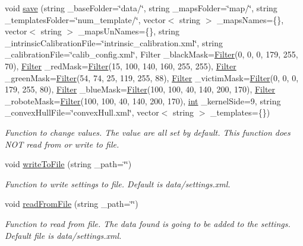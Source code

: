 \begin{DoxyCompactItemize}
void \mbox{\hyperlink{class_settings_a14ebf63b888dd7ecf7a34de9eaba1ae8}{save}} (string \+\_\+base\+Folder=\char`\"{}data/\char`\"{}, string \+\_\+maps\+Folder=\char`\"{}map/\char`\"{}, string \+\_\+templates\+Folder=\char`\"{}num\+\_\+template/\char`\"{}, vector$<$ string $>$ \+\_\+maps\+Names=\{\}, vector$<$ string $>$ \+\_\+maps\+Un\+Names=\{\}, string \+\_\+intrinsic\+Calibration\+File=\char`\"{}intrinsic\+\_\+calibration.\+xml\char`\"{}, string \+\_\+calibration\+File=\char`\"{}calib\+\_\+config.\+xml\char`\"{}, Filter \+\_\+black\+Mask=\mbox{\hyperlink{class_filter}{Filter}}(0, 0, 0, 179, 255, 70), \mbox{\hyperlink{class_filter}{Filter}} \+\_\+red\+Mask=\mbox{\hyperlink{class_filter}{Filter}}(15, 100, 140, 160, 255, 255), \mbox{\hyperlink{class_filter}{Filter}} \+\_\+green\+Mask=\mbox{\hyperlink{class_filter}{Filter}}(54, 74, 25, 119, 255, 88), \mbox{\hyperlink{class_filter}{Filter}} \+\_\+victim\+Mask=\mbox{\hyperlink{class_filter}{Filter}}(0, 0, 0, 179, 255, 80), \mbox{\hyperlink{class_filter}{Filter}} \+\_\+blue\+Mask=\mbox{\hyperlink{class_filter}{Filter}}(100, 100, 40, 140, 200, 170), \mbox{\hyperlink{class_filter}{Filter}} \+\_\+robote\+Mask=\mbox{\hyperlink{class_filter}{Filter}}(100, 100, 40, 140, 200, 170), \mbox{\hyperlink{draw_8hh_aa620a13339ac3a1177c86edc549fda9b}{int}} \+\_\+kernel\+Side=9, string \+\_\+convex\+Hull\+File=\char`\"{}convex\+Hull.\+xml\char`\"{}, vector$<$ string $>$ \+\_\+templates=\{\})
\begin{DoxyCompactList}\small\item\em Function to change values. The value are all set by default. This function does N\+OT read from or write to file. \end{DoxyCompactList}\item 
void \mbox{\hyperlink{class_settings_a69b5dc81f8928efdcfc19e409f6015fb}{write\+To\+File}} (string \+\_\+path=\char`\"{}\char`\"{})
\begin{DoxyCompactList}\small\item\em Function to write settings to file. Default is data/settings.\+xml. \end{DoxyCompactList}\item 
void \mbox{\hyperlink{class_settings_a8491d82663ed43dadc540c4a402156fc}{read\+From\+File}} (string \+\_\+path=\char`\"{}\char`\"{})
\begin{DoxyCompactList}\small\item\em Function to read from file. The data found is going to be added to the settings. Default file is data/settings.\+xml. \end{DoxyCompactList}\item 

\end{DoxyCompactItemize}
